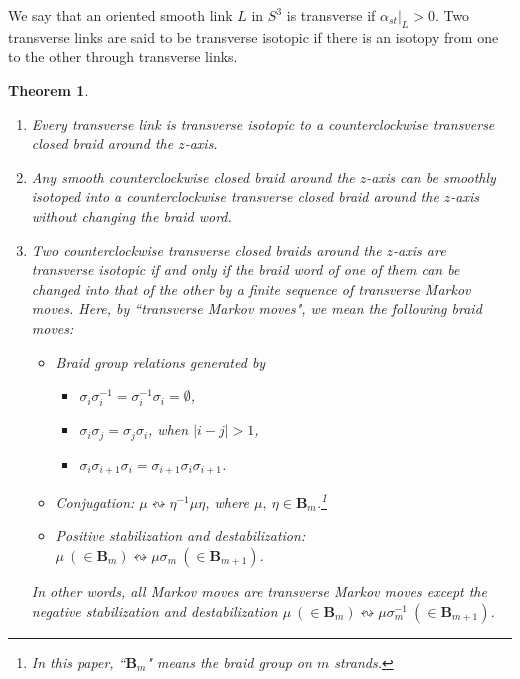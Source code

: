 \documentclass{amsart}
\theoremstyle{plain}
\newtheorem{theorem}{Theorem}[section]
\theoremstyle{definition}
\theoremstyle{remark}
\numberwithin{equation}{section}
\begin{document}
We say that an oriented smooth link $L$ in $S^3$ is transverse if $\alpha_{st}|_L>0$. Two transverse links are said to be transverse isotopic if there is an isotopy from one to the other through transverse links.

\begin{theorem}\cite{Ben,OSh,Wr}\label{transversal-markov}
\begin{enumerate}
	\item Every transverse link is transverse isotopic to a counterclockwise transverse closed braid around the $z$-axis.
	\item Any smooth counterclockwise closed braid around the $z$-axis can be smoothly isotoped into a counterclockwise transverse closed braid around the $z$-axis without changing the braid word.
	\item Two counterclockwise transverse closed braids around the $z$-axis are transverse isotopic if and only if the braid word of one of them can be changed into that of the other by a finite sequence of transverse Markov moves. Here, by ``transverse Markov moves", we mean the following braid moves:
	\begin{itemize}
    \item Braid group relations generated by
    \begin{itemize}
	  \item $\sigma_i\sigma_i^{-1}=\sigma_i^{-1}\sigma_i=\emptyset$,
	  \item $\sigma_i\sigma_j=\sigma_j\sigma_i$, when $|i-j|>1$,
	  \item $\sigma_i\sigma_{i+1}\sigma_i=\sigma_{i+1}\sigma_i\sigma_{i+1}$.
    \end{itemize}
    \item Conjugation: $\mu\leftrightsquigarrow\eta^{-1}\mu\eta$,
    where $\mu,~\eta\in \mathbf{B}_m$.\footnote{In this paper, ``$\mathbf{B}_m$" means the braid group on $m$ strands.}
    \item Positive stabilization and destabilization: $\mu~(\in \mathbf{B}_m)\leftrightsquigarrow \mu\sigma_m~(\in \mathbf{B}_{m+1})$.
  \end{itemize}
	In other words, all Markov moves are transverse Markov moves except the negative stabilization and destabilization $\mu~(\in \mathbf{B}_m)\leftrightsquigarrow \mu\sigma_m^{-1}~(\in \mathbf{B}_{m+1})$.
\end{enumerate}
\end{theorem}
\end{document}
